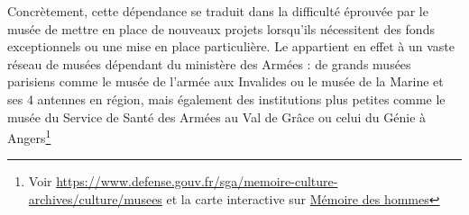 Concrètement, cette dépendance se traduit dans la difficulté éprouvée par le musée de mettre en place de nouveaux projets lorsqu'ils nécessitent des fonds exceptionnels ou une mise en place particulière. Le \mae appartient en effet à un vaste réseau de musées dépendant du ministère des Armées : de grands musées parisiens comme le musée de l'armée aux Invalides ou le musée de la Marine et ses 4 antennes en région, mais également des institutions plus petites comme le musée du Service de Santé des Armées au Val de Grâce ou celui du Génie à Angers\footnote{Voir \url{https://www.defense.gouv.fr/sga/memoire-culture-archives/culture/musees} et la carte interactive sur \href{https://www.memoiredeshommes.sga.defense.gouv.fr/musees-collections-et-mecenat/musees-et-monuments?arko_default_66e300e1e4149--ficheFocus=&arko_default_66e300e1e4149--filtreGroupes%5Bmode%5D=simple&arko_default_66e300e1e4149--filtreGroupes%5Bop%5D=AND&arko_default_66e300e1e4149--filtreGroupes%5Bgroupes%5D%5B0%5D%5Barko_default_66e3e92614177%5D%5Bop%5D=AND&arko_default_66e300e1e4149--filtreGroupes%5Bgroupes%5D%5B0%5D%5Barko_default_66e3e92614177%5D%5Bq%5D%5B%5D=Musée%5B%5Barko_fiche_669e283a1c5ce%5D%5D&arko_default_66e300e1e4149--filtreGroupes%5Bgroupes%5D%5B0%5D%5Barko_default_66e3e92614177%5D%5Bextras%5D%5Bmode%5D=select&arko_default_66e300e1e4149--from=0&arko_default_66e300e1e4149--resultSize=0&arko_default_66e300e1e4149--contenuIds%5B%5D=6818681&arko_default_66e300e1e4149--modeRestit=arko_default_66ec29de0889b}{Mémoire des hommes}}


% 
%
%
